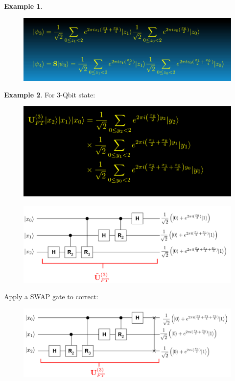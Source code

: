 \documentclass{book}
\theoremstyle{definition}
\newtheorem{exmp}{Example}[section]
\begin{document}
\begin{exmp}
\begin{figure}[!htb]
	\end{figure}
	\begin{figure}[!htb]
		\centering
		\includegraphics[scale=0.5]{qft5}
	\end{figure}
\end{exmp}
\newpage


\begin{exmp}
	For 3-Qbit state: 
	\begin{figure}[!htb]
		\centering
		\includegraphics[scale=0.5]{qft6}
	\end{figure}




	\begin{figure}[!htb]
		\centering
		\includegraphics[scale=0.5]{qft7}
	\end{figure}



	Apply a SWAP gate to correct:
	\begin{figure}[!htb]
		\centering
		\includegraphics[scale=0.5]{qft8}
	\end{figure}
\end{exmp}
\end{document}
